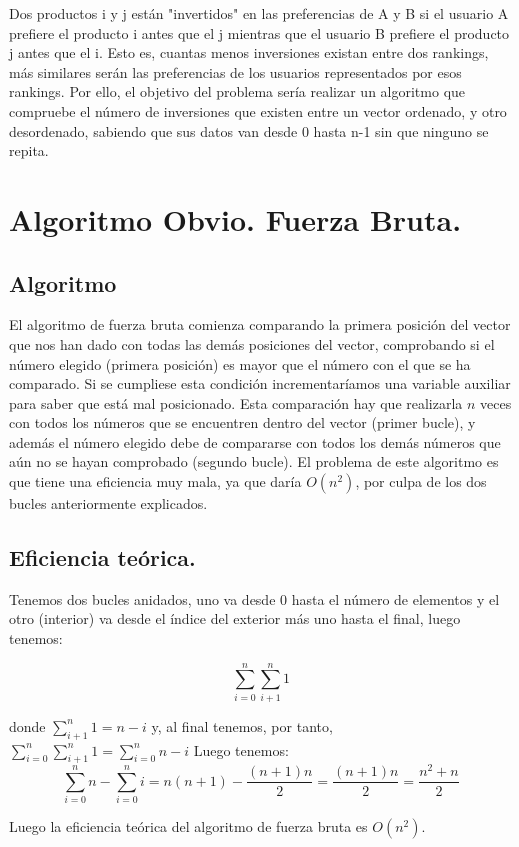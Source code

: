 \documentclass[a4paper, 11pt]{article}
\begin{document}
	Dos productos i y j están "invertidos" en las preferencias de A y B si el usuario
	A prefiere el producto i antes que el j mientras que el usuario B prefiere el
	producto j antes que el i.
	Esto es, cuantas menos inversiones existan entre dos rankings, más similares
	serán las preferencias de los usuarios representados por esos rankings.
	Por ello, el objetivo del problema sería realizar un algoritmo que compruebe el
	número de inversiones que existen entre un vector ordenado, y otro desordenado, sabiendo
	que sus datos van desde 0 hasta n-1 sin que ninguno se repita.
	
\section{Algoritmo Obvio. Fuerza Bruta.}
\subsection{Algoritmo}
	El algoritmo de fuerza bruta comienza comparando la primera posición del vector que nos han dado con todas las demás posiciones del vector, comprobando si el número elegido (primera posición) es mayor que el número con el que se ha comparado. Si se cumpliese esta condición incrementaríamos una variable auxiliar para saber que está mal posicionado. Esta comparación hay que realizarla $n$ veces con todos los números que se encuentren dentro del vector (primer bucle), y además el número elegido debe de compararse con todos los demás números que aún no se hayan comprobado (segundo bucle). El problema de este algoritmo es que tiene una eficiencia muy mala, ya que daría $O(n^2)$, por culpa de los dos bucles anteriormente explicados.
	
\subsection{Eficiencia teórica.}
Tenemos dos bucles anidados, uno va desde 0 hasta el número de elementos y el otro (interior) va desde el índice del exterior más uno hasta el final, luego tenemos:

$$\sum_{i=0}^{n}\sum_{i+1}^{n}1$$

donde $\sum_{i+1}^{n}1=n-i$ y, al final tenemos, por tanto, $\sum_{i=0}^{n}\sum_{i+1}^{n}1 = \sum_{i=0}^{n}n-i$
Luego tenemos:
$$\sum_{i=0}^{n}n - \sum_{i=0}^{n}i  = n(n+1)-\frac{(n+1)n}{2}= \frac{(n+1)n}{2}=\frac{n^2+n}{2}$$

Luego la eficiencia teórica del algoritmo de fuerza bruta es $O(n^2)$.
\end{document}
